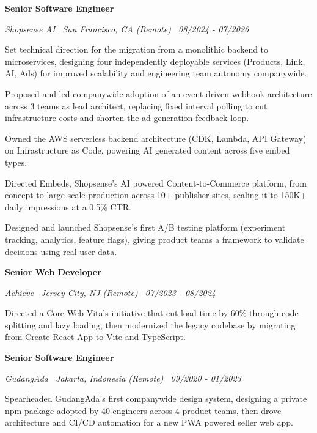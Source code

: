 \documentclass[10pt]{article}
\newenvironment{roleblock}{\par\vspace{0.9pt}}{}
\newcommand{\roletitle}[1]{%
    {\fontsize{9.8pt}{10.8pt}\selectfont\bfseries\color{textcolor} #1}\par\vspace{0.3pt}
}
\newcommand{\rolemeta}[1]{%
    {\fontsize{8.6pt}{9.3pt}\selectfont\itshape\color{metacolor} #1}\par\vspace{0.45pt}
}
\begin{document}
\begin{roleblock}
\roletitle{Senior Software Engineer}
\rolemeta{Shopsense AI \textbar\ San Francisco, CA (Remote) \textbar\ 08/2024 - 07/2026}
\begin{resumebullets}
\item Set technical direction for the migration from a monolithic backend to microservices, designing four independently deployable services (Products, Link, AI, Ads) for improved scalability and engineering team autonomy companywide.
\item Proposed and led companywide adoption of an event driven webhook architecture across 3 teams as lead architect, replacing fixed interval polling to cut infrastructure costs and shorten the ad generation feedback loop.
\item Owned the AWS serverless backend architecture (CDK, Lambda, API Gateway) on Infrastructure as Code, powering AI generated content across five embed types.
\item Directed Embeds, Shopsense's AI powered Content-to-Commerce platform, from concept to large scale production across 10+ publisher sites, scaling it to 150K+ daily impressions at a 0.5\% CTR.
\item Designed and launched Shopsense's first A/B testing platform (experiment tracking, analytics, feature flags), giving product teams a framework to validate decisions using real user data.
\end{resumebullets}
\end{roleblock}

\begin{roleblock}
\roletitle{Senior Web Developer}
\rolemeta{Achieve \textbar\ Jersey City, NJ (Remote) \textbar\ 07/2023 - 08/2024}
\begin{resumebullets}
\item Directed a Core Web Vitals initiative that cut load time by 60\% through code splitting and lazy loading, then modernized the legacy codebase by migrating from Create React App to Vite and TypeScript.
\end{resumebullets}
\end{roleblock}

\begin{roleblock}
\roletitle{Senior Software Engineer}
\rolemeta{GudangAda \textbar\ Jakarta, Indonesia (Remote) \textbar\ 09/2020 - 01/2023}
\begin{resumebullets}
\item Spearheaded GudangAda's first companywide design system, designing a private npm package adopted by 40 engineers across 4 product teams, then drove architecture and CI/CD automation for a new PWA powered seller web app.
\end{resumebullets}
\end{roleblock}
\end{document}
